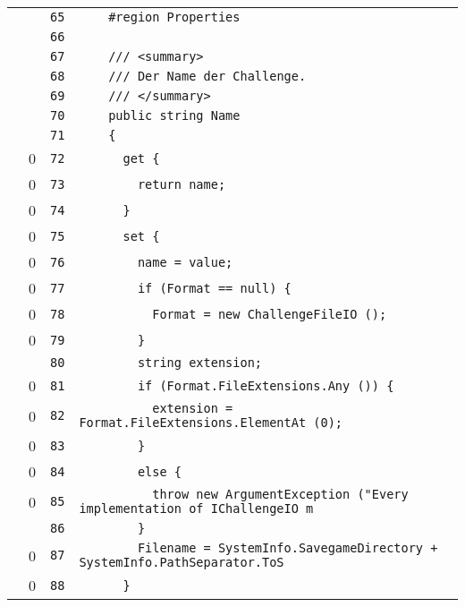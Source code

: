 \documentclass[a4paper,10pt]{article}
\begin{document}
\begin{longtable}[l]{lrrl}
\cellcolor{gray} &  & \verb~65~ & \verb~    #region Properties~\\
\cellcolor{gray} &  & \verb~66~ & \verb~~\\
\cellcolor{gray} &  & \verb~67~ & \verb~    /// <summary>~\\
\cellcolor{gray} &  & \verb~68~ & \verb~    /// Der Name der Challenge.~\\
\cellcolor{gray} &  & \verb~69~ & \verb~    /// </summary>~\\
\cellcolor{gray} &  & \verb~70~ & \verb~    public string Name~\\
\cellcolor{gray} &  & \verb~71~ & \verb~    {~\\
\cellcolor{red} & 0 & \verb~72~ & \verb~      get {~\\
\cellcolor{red} & 0 & \verb~73~ & \verb~        return name;~\\
\cellcolor{red} & 0 & \verb~74~ & \verb~      }~\\
\cellcolor{red} & 0 & \verb~75~ & \verb~      set {~\\
\cellcolor{red} & 0 & \verb~76~ & \verb~        name = value;~\\
\cellcolor{red} & 0 & \verb~77~ & \verb~        if (Format == null) {~\\
\cellcolor{red} & 0 & \verb~78~ & \verb~          Format = new ChallengeFileIO ();~\\
\cellcolor{red} & 0 & \verb~79~ & \verb~        }~\\
\cellcolor{gray} &  & \verb~80~ & \verb~        string extension;~\\
\cellcolor{red} & 0 & \verb~81~ & \verb~        if (Format.FileExtensions.Any ()) {~\\
\cellcolor{red} & 0 & \verb~82~ & \verb~          extension = Format.FileExtensions.ElementAt (0);~\\
\cellcolor{red} & 0 & \verb~83~ & \verb~        }~\\
\cellcolor{red} & 0 & \verb~84~ & \verb~        else {~\\
\cellcolor{red} & 0 & \verb~85~ & \verb~          throw new ArgumentException ("Every implementation of IChallengeIO m~\\
\cellcolor{gray} &  & \verb~86~ & \verb~        }~\\
\cellcolor{red} & 0 & \verb~87~ & \verb~        Filename = SystemInfo.SavegameDirectory + SystemInfo.PathSeparator.ToS~\\
\cellcolor{red} & 0 & \verb~88~ & \verb~      }~\\

\end{longtable}
\end{document}
